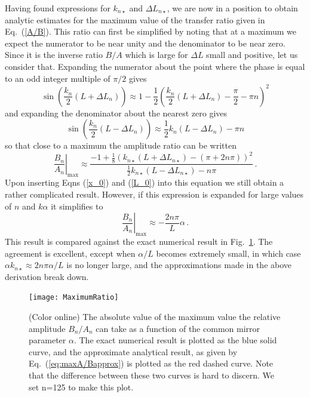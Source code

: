 \documentclass[twocolumn,english,pra,aps,superscriptaddress,floatfix]{revtex4-1}
\begin{document}
Having found expressions for $k_{n \star}$ and $\Delta L_{n \star}$, we are now in a position to obtain analytic estimates for the maximum value of the transfer ratio given in Eq.\ (\ref{A/B}). This ratio can first be simplified by noting that at a maximum we expect the numerator  to be near unity and the denominator to be near zero. Since it is  the inverse ratio $B/A$ which is large for $\Delta L$ small and positive, let us consider that. Expanding the numerator about the point where the phase is equal to an odd integer multiple of $\pi/2$ gives
\begin{equation}
\sin\left(\frac{k_{n}}{2}(L+\Delta L_{n})\right) \approx 1-\frac{1}{2}\left(\frac{k_{n}}{2}(L+\Delta L_{n})-\frac{\pi}{2}-\pi n\right)^{2}
\end{equation}
and expanding the denominator about the nearest zero gives
\begin{equation}
\sin\left(\frac{k_{n}}{2}(L-\Delta L_{n})\right) \approx \frac{1}{2}k_{n}(L-\Delta L_{n})-\pi n
\end{equation}
so that close to a maximum the amplitude ratio can be written 
\begin{equation}
\left. \frac{B_{n}}{A_{n}}\right\vert_{\mathrm{max}} \approx \frac{-1+\frac{1}{8}\left(k_{n \star}(L+\Delta L_{n \star})-(\pi+2n\pi)\right)^{2}}{\frac{1}{2}k_{n \star}(L-\Delta L_{n \star})-n\pi} \, .
\end{equation}
Upon inserting Eqns (\ref{x_0}) and (\ref{L_0}) into this equation we still obtain a rather complicated result. However, if this expression is expanded for large values of $n$ and $k \alpha$ it simplifies to
\begin{equation}
\left. \frac{B_{n}}{A_{n}}  \right\vert_{\mathrm{max}}  \approx  - \frac{2n\pi}{L}\alpha \, .
\label{eq:maxA/Bapprox}
\end{equation}
This result is compared against the exact numerical result in Fig.\ \ref{fig:MaxAoverB}. The agreement is excellent, except when $\alpha/L$ becomes extremely small, in which case $\alpha k_{n \star} \approx 2 n \pi \alpha /L$ is no longer large, and the approximations made in the above derivation break down. 

\begin{figure}
\texttt{[image: MaximumRatio]}
\caption{(Color online) The absolute value of the maximum value the relative amplitude $B_{n}/A_{n}$ can take as 
a function of the common mirror parameter $\alpha$. The exact numerical result is plotted as the blue solid curve, and the approximate analytical result, as given by Eq.\ (\ref{eq:maxA/Bapprox}) is plotted as the red dashed curve. Note that the difference between these two curves is hard to discern.  We set n=125 to make this plot.}
\label{fig:MaxAoverB}
\end{figure}
\end{document}

